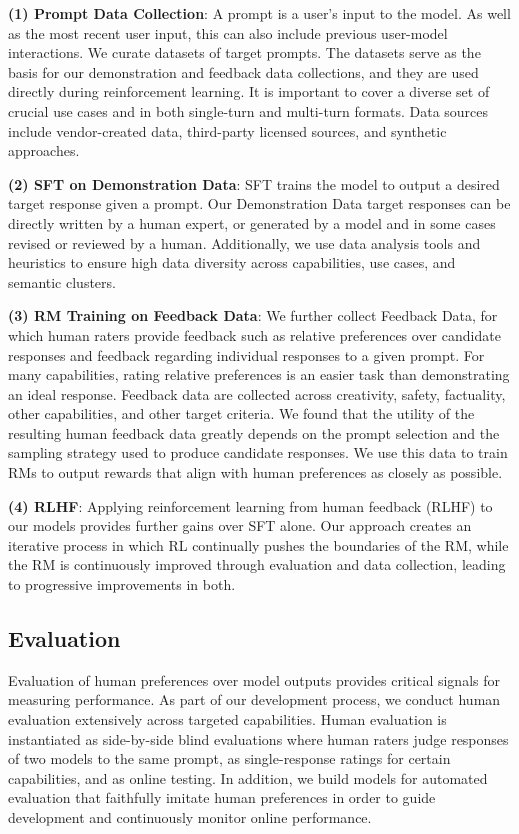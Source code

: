 \textbf{(1) Prompt Data Collection}: A prompt is a user’s input to the model. As well as the most recent user input, this can also include previous user-model interactions. We curate datasets of target prompts. The datasets serve as the basis for our demonstration and feedback data collections, and they are used directly during reinforcement learning. It is important to cover a diverse set of crucial use cases and in both single-turn and multi-turn formats. Data sources include vendor-created data, third-party licensed sources, and synthetic approaches. 

\textbf{(2) SFT on Demonstration Data}: SFT trains the model to output a desired target response given a prompt. Our Demonstration Data target responses can be directly written by a human expert, or generated by a model and in some cases revised or reviewed by a human. Additionally, we use data analysis tools and heuristics to ensure high data diversity across capabilities, use cases, and semantic clusters. 

\textbf{(3) RM Training on Feedback Data}: We further collect Feedback Data, for which human raters provide feedback such as relative preferences over candidate responses and feedback regarding individual responses to a given prompt. For many capabilities, rating relative preferences is an easier task than demonstrating an ideal response. Feedback data are collected across creativity, safety, factuality, other capabilities, and other target criteria. We found that the utility of the resulting human feedback data greatly depends on the prompt selection and the sampling strategy used to produce candidate responses.  We use this data to train RMs to output rewards that align with human preferences as closely as possible. 

\textbf{(4) RLHF}: Applying reinforcement learning from human feedback (RLHF) to our models provides further gains over SFT alone. Our approach creates an iterative process in which RL continually pushes the boundaries of the RM, while the RM is continuously improved through evaluation and data collection, leading to progressive improvements in both.

\subsection{Evaluation}
\label{sec:post-training-eval}

Evaluation of human preferences over model outputs provides critical signals for measuring performance. As part of our development process, we conduct human evaluation extensively across targeted capabilities. Human evaluation is instantiated as side-by-side blind evaluations where human raters judge responses of two models to the same prompt, as single-response ratings for certain capabilities, and as online testing. In addition, we build models for automated evaluation that faithfully imitate human preferences in order to guide development and continuously monitor online performance.

